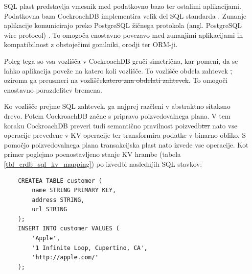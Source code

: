 \documentclass[a4paper, 12pt]{book}
\providecommand{\DIFaddtex}[1]{{\protect\color{blue}\uwave{#1}}} %
\providecommand{\DIFdeltex}[1]{{\protect\color{red}\sout{#1}}}                      %
\providecommand{\DIFaddbegin}{} %
\providecommand{\DIFaddend}{} %
\providecommand{\DIFdelbegin}{} %
\providecommand{\DIFdelend}{} %
\providecommand{\DIFadd}[1]{\texorpdfstring{\DIFaddtex{#1}}{#1}} %
\providecommand{\DIFdel}[1]{\texorpdfstring{\DIFdeltex{#1}}{}} %
\newcommand{\DIFscaledelfig}{0.5}
\newlength{\DIFdelgraphicswidth} %
\newlength{\DIFdelgraphicsheight} %
\newcommand{\DIFaddincludegraphics}[2][]{{\color{blue}\fbox{\DIFOincludegraphics[#1]{#2}}}} %
\newcommand{\DIFdelincludegraphics}[2][]{%
\sbox{\DIFdelgraphicsbox}{\DIFOincludegraphics[#1]{#2}}%
\settoboxwidth{\DIFdelgraphicswidth}{\DIFdelgraphicsbox} %
\settoboxtotalheight{\DIFdelgraphicsheight}{\DIFdelgraphicsbox} %
\scalebox{\DIFscaledelfig}{%
\parbox[b]{\DIFdelgraphicswidth}{\usebox{\DIFdelgraphicsbox}\\[-\baselineskip] \rule{\DIFdelgraphicswidth}{0em}}\llap{\resizebox{\DIFdelgraphicswidth}{\DIFdelgraphicsheight}{%
\setlength{\unitlength}{\DIFdelgraphicswidth}%
\begin{picture}(1,1)%
\thicklines\linethickness{2pt} %
{\color[rgb]{1,0,0}\put(0,0){\framebox(1,1){}}}%
{\color[rgb]{1,0,0}\put(0,0){\line( 1,1){1}}}%
{\color[rgb]{1,0,0}\put(0,1){\line(1,-1){1}}}%
\end{picture}%
}\hspace*{3pt}}} %
} %
\DeclareRobustCommand{\DIFaddbegin}{\DIFOaddbegin \let\includegraphics\DIFaddincludegraphics} %
\DeclareRobustCommand{\DIFaddend}{\DIFOaddend \let\includegraphics\DIFOincludegraphics} %
\DeclareRobustCommand{\DIFdelbegin}{\DIFOdelbegin \let\includegraphics\DIFdelincludegraphics} %
\DeclareRobustCommand{\DIFdelend}{\DIFOaddend \let\includegraphics\DIFOincludegraphics} %
\begin{document}
SQL plast predstavlja vmesnik med podatkovno bazo ter ostalimi aplikacijami.  Podatkovna baza CockroachDB implementira velik del SQL standarda \cite{CRDB-sql-standard}. Zunanje aplikacije komunicirajo preko PostgreSQL žičnega protokola (angl. PostgreSQL wire protocol) \cite{psql-wire-protocol}. To omogoča enostavno povezavo med zunanjimi aplikacijami in kompatibilnost z obstoječimi gonilniki, orodji ter ORM-ji.

Poleg tega so vsa vozlišča v CockroachDB gruči simetrična, kar pomeni, da se lahko aplikacija poveže na katero koli vozlišče. To vozlišče obdela zahtevek \DIFdelbegin \DIFdel{, }\DIFdelend oziroma ga preusmeri na vozlišče\DIFdelbegin \DIFdel{katero zna obdelati zahtevek}\DIFdelend \DIFaddbegin \DIFadd{, katero ga zna obdelati}\DIFaddend . To omogoči enostavno porazdelitev bremena.

Ko vozlišče prejme SQL zahtevek, ga najprej razčleni v abstraktno sitaksno drevo. Potem CockroachDB začne s pripravo poizvedovalnega plana. V tem koraku CockroachDB preveri tudi semantično pravilnost poizvedb\DIFdelbegin \DIFdel{ter }\DIFdelend \DIFaddbegin \DIFadd{, }\DIFaddend nato vse operacije prevedene v KV operacije ter transformira podatke v binarno obliko. S pomočjo poizvedovalnega plana transakcijska plast nato izvede vse operacije. Kot primer poglejmo poenostavljeno stanje KV hrambe (tabela \ref{tbl_crdb_sql_kv_mapping}) po izvedbi naslednjih SQL stavkov:

\begin{listing}[H]
\begin{verbatim}
    CREATEA TABLE customer (
        name STRING PRIMARY KEY,
        address STRING,
        url STRING
    );
    INSERT INTO customer VALUES (
        'Apple',
        '1 Infinite Loop, Cupertino, CA',
        'http://apple.com/'
    );
\end{verbatim}
\label{sql-example-sql-mapping}
\end{listing}
\end{document}
